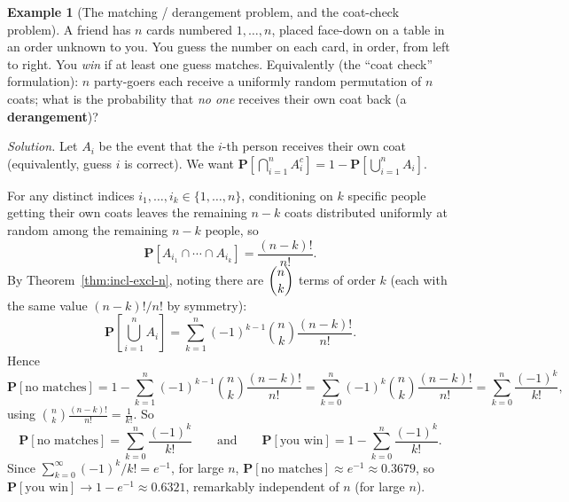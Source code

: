 \documentclass[11pt]{article}
\theoremstyle{definition}
\newtheorem{example}[definition]{Example}
\theoremstyle{plain}
\theoremstyle{remark}
\begin{document}
\begin{example}[The matching / derangement problem, and the coat-check problem]
\label{ex:derangement}
A friend has $n$ cards numbered $1,\dots,n$, placed face-down on a table in an order unknown to
you. You guess the number on each card, in order, from left to right. You \emph{win} if at least
one guess matches. Equivalently (the ``coat check'' formulation): $n$ party-goers each receive a
uniformly random permutation of $n$ coats; what is the probability that \emph{no one} receives
their own coat back (a \textbf{derangement})?

\emph{Solution.} Let $A_i$ be the event that the $i$-th person receives their own coat (equivalently,
guess $i$ is correct). We want $\mathbf{P}\!\left[\bigcap_{i=1}^n A_i^c\right] = 1 - \mathbf{P}\!\left[\bigcup_{i=1}^n A_i\right]$.

For any distinct indices $i_1,\dots,i_k \in \{1,\dots,n\}$, conditioning on $k$ specific people
getting their own coats leaves the remaining $n-k$ coats distributed uniformly at random among the
remaining $n-k$ people, so
\[
\mathbf{P}[A_{i_1}\cap \cdots \cap A_{i_k}] = \frac{(n-k)!}{n!}.
\]
By Theorem~\ref{thm:incl-excl-n}, noting there are $\dbinom{n}{k}$ terms of order $k$
(each with the same value $(n-k)!/n!$ by symmetry):
\[
\mathbf{P}\!\left[\bigcup_{i=1}^n A_i\right] = \sum_{k=1}^n (-1)^{k-1}\binom{n}{k}\frac{(n-k)!}{n!}.
\]
Hence
\[
\mathbf{P}[\text{no matches}] = 1 - \sum_{k=1}^n (-1)^{k-1}\binom{n}{k}\frac{(n-k)!}{n!}
= \sum_{k=0}^n (-1)^k \binom{n}{k}\frac{(n-k)!}{n!} = \sum_{k=0}^n \frac{(-1)^k}{k!},
\]
using $\binom{n}{k}\frac{(n-k)!}{n!} = \frac{1}{k!}$. So
\[
\boxed{\mathbf{P}[\text{no matches}] = \sum_{k=0}^n \frac{(-1)^k}{k!}}
\qquad\text{and}\qquad
\mathbf{P}[\text{you win}] = 1 - \sum_{k=0}^n \frac{(-1)^k}{k!}.
\]
Since $\sum_{k=0}^\infty (-1)^k/k! = e^{-1}$, for large $n$,
$\mathbf{P}[\text{no matches}] \approx e^{-1} \approx 0.3679$, so
$\mathbf{P}[\text{you win}] \to 1-e^{-1} \approx 0.6321$, remarkably independent of $n$ (for large
$n$).
\end{example}
\end{document}
